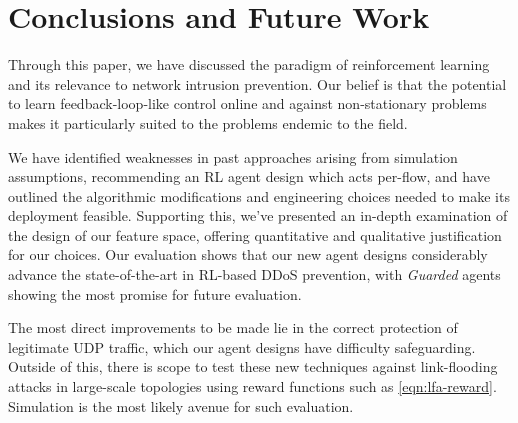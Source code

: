\documentclass[10pt, times, conference, letterpaper]{IEEEtran}
\begin{document}

\section{Conclusions and Future Work}
Through this paper, we have discussed the paradigm of reinforcement learning and its relevance to network intrusion prevention.
Our belief is that the potential to learn feedback-loop-like control online and against non-stationary problems makes it particularly suited to the problems endemic to the field.

We have identified weaknesses in past approaches arising from simulation assumptions, recommending an RL agent design which acts per-flow, and have outlined the algorithmic modifications and engineering choices needed to make its deployment feasible.
Supporting this, we've presented an in-depth examination of the design of our feature space, offering quantitative and qualitative justification for our choices.
Our evaluation shows that our new agent designs considerably advance the state-of-the-art in RL-based DDoS prevention, with \emph{Guarded} agents showing the most promise for future evaluation.

The most direct improvements to be made lie in the correct protection of legitimate UDP traffic, which our agent designs have difficulty safeguarding.
Outside of this, there is scope to test these new techniques against link-flooding attacks in large-scale topologies using reward functions such as \cref{eqn:lfa-reward}.
Simulation is the most likely avenue for such evaluation.


\end{document}
